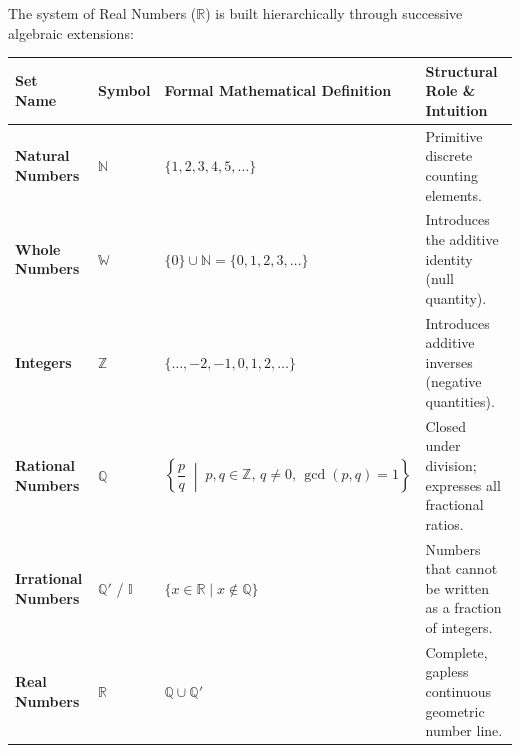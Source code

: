 \documentclass[10pt,a4paper]{article}
\begin{document}
The system of Real Numbers ($\mathbb{R}$) is built hierarchically through successive algebraic extensions:

\begin{center}
{\small
\begin{tabularx}{\textwidth}{@{}lllX@{}}
  \toprule
  \textbf{\color{navy}Set Name} & \textbf{\color{navy}Symbol} & \textbf{\color{navy}Formal Mathematical Definition} & \textbf{\color{navy}Structural Role \& Intuition} \\
  \midrule
  \textbf{Natural Numbers} & $\mathbb{N}$ & $\{1, 2, 3, 4, 5, \dots\}$ & Primitive discrete counting elements. \\
  \addlinespace[1.5pt]
  \textbf{Whole Numbers} & $\mathbb{W}$ & $\{0\} \cup \mathbb{N} = \{0, 1, 2, 3, \dots\}$ & Introduces the additive identity (null quantity). \\
  \addlinespace[1.5pt]
  \textbf{Integers} & $\mathbb{Z}$ & $\{\dots, -2, -1, 0, 1, 2, \dots\}$ & Introduces additive inverses (negative quantities). \\
  \addlinespace[1.5pt]
  \textbf{Rational Numbers} & $\mathbb{Q}$ & $\left\{ \dfrac{p}{q} \;\middle|\; p, q \in \mathbb{Z}, \, q \ne 0, \, \gcd(p, q) = 1 \right\}$ & Closed under division; expresses all fractional ratios. \\
  \addlinespace[1.5pt]
  \textbf{Irrational Numbers} & $\mathbb{Q}'$ / $\mathbb{I}$ & $\{ x \in \mathbb{R} \mid x \notin \mathbb{Q} \}$ & Numbers that cannot be written as a fraction of integers. \\
  \addlinespace[1.5pt]
  \textbf{Real Numbers} & $\mathbb{R}$ & $\mathbb{Q} \cup \mathbb{Q}'$ & Complete, gapless continuous geometric number line. \\
  \bottomrule
\end{tabularx}}
\end{center}
\end{document}
